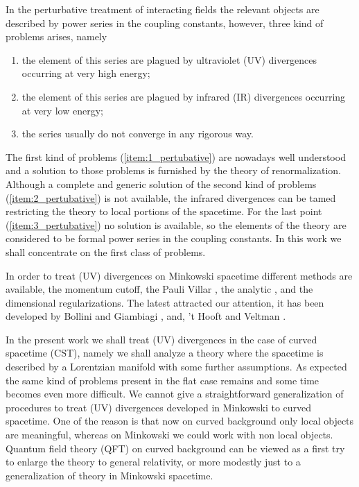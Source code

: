 \documentclass[11pt]{book}
\theoremstyle{break}
\begin{document}
In the perturbative treatment of interacting fields the relevant objects are described by power series in the coupling constants, however, three kind of problems arises, namely
%
\begin{enumerate}
\item\label{item:1_pertubative} the element of this series are plagued by ultraviolet (UV) divergences occurring at very high energy;
%
\item\label{item:2_pertubative} the element of this series are plagued by infrared (IR) divergences occurring at very low energy;
%
\item\label{item:3_pertubative} the series usually do not converge in any rigorous way.
\end{enumerate}
%
The first kind of problems (\ref{item:1_pertubative}) are nowadays well understood and a solution to those problems is furnished by the theory of renormalization. Although a complete and generic solution of the second kind of problems (\ref{item:2_pertubative}) is not available, the infrared divergences can be tamed restricting the theory to local portions of the spacetime. For the last point (\ref{item:3_pertubative}) no solution is available, so the elements of the theory are considered to be formal power series in the coupling constants. 
In this work we shall concentrate on the first class of problems.\par%


In order to treat (UV) divergences on Minkowski spacetime different methods are available, the momentum cutoff, the Pauli Villar \cite{PV_1949}, the analytic \cite{SPEER_1968}, and the dimensional regularizations. The latest attracted our attention, it has been developed by Bollini and Giambiagi \cite{BG_1972}, and, 't Hooft and Veltman \cite{THV_1972}.\par%


In the present work we shall treat (UV) divergences in the case of curved spacetime (CST), namely we shall analyze a theory where the spacetime is described by a Lorentzian manifold with some further assumptions. As expected the same kind of problems present in the flat case remains and some time becomes even more difficult. We cannot give a straightforward generalization of procedures to treat (UV) divergences developed in Minkowski to curved spacetime. One of the reason is that now on curved background only local objects are meaningful, whereas on Minkowski we could work with non local objects. Quantum field theory (QFT) on curved background can be viewed as a first try to enlarge the theory to general relativity, or more modestly just to a generalization of theory in Minkowski spacetime.\par%
\end{document}
